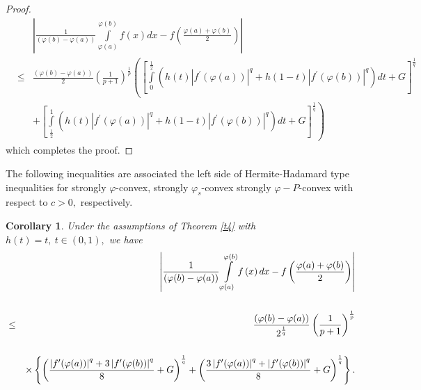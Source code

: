 \documentclass{amsart}
\theoremstyle{plain}
\newtheorem{corollary}{Corollary}
\numberwithin{equation}{section}
\begin{document}
\begin{proof}
\begin{eqnarray*}
&&\left\vert \frac{1}{(\varphi (b)-\varphi (a))}\int\limits_{\varphi
(a)}^{\varphi (b)}f\left( x\right) dx-f\left( \frac{\varphi (a)+\varphi (b)}{2}\right) \right\vert  \\
&\leq &\frac{(\varphi (b)-\varphi (a))}{2}\left( \frac{1}{p+1}\right) ^{\frac{1}{p}}\left( \left[ \int\limits_{0}^{\frac{1}{2}}\left( h(t)\left\vert
f^{\prime }(\varphi (a))\right\vert ^{q}+h(1-t)\left\vert f^{\prime
}(\varphi (b))\right\vert ^{q}\right) dt+G\right] ^{\frac{1}{q}}\right.  \\
&&+\left. \left[ \int\limits_{\frac{1}{2}}^{1}\left( h(t)\left\vert
f^{\prime }(\varphi (a))\right\vert ^{q}+h(1-t)\left\vert f^{\prime
}(\varphi (b))\right\vert ^{q}\right) dt+G\right] ^{\frac{1}{q}}\right) 
\end{eqnarray*}which completes the proof.
\end{proof}

The following inequalities are associated the left side of Hermite-Hadamard
type inequalities for strongly $\varphi $-convex, strongly $\varphi _{s}$-convex strongly $\varphi -P$-convex with respect to $c>0,$ respectively.

\begin{corollary}
Under the assumptions of Theorem \ref{t4} with $h(t)=t,\ t\in \left(
0,1\right) ,$ we have\begin{eqnarray}
&&\left\vert \frac{1}{(\varphi (b)-\varphi (a))}\int\limits_{\varphi
(a)}^{\varphi (b)}f\left( x\right) dx-f\left( \frac{\varphi (a)+\varphi (b)}{2}\right) \right\vert   \notag \\
&&  \notag \\
&\leq &\dfrac{(\varphi (b)-\varphi (a))}{2^{\frac{1}{q}}}\left( \frac{1}{p+1}\right) ^{\frac{1}{p}}  \label{10} \\
&&  \notag \\
&&\times \left\{ \left( \frac{\left\vert f^{\prime }(\varphi (a))\right\vert
^{q}+3\left\vert f^{\prime }(\varphi (b))\right\vert ^{q}}{8}+G\right) ^{\frac{1}{q}}+\left( \frac{3\left\vert f^{\prime }(\varphi (a))\right\vert
^{q}+\left\vert f^{\prime }(\varphi (b))\right\vert ^{q}}{8}+G\right) ^{\frac{1}{q}}\right\} .  \notag
\end{eqnarray}
\end{corollary}
\end{document}
